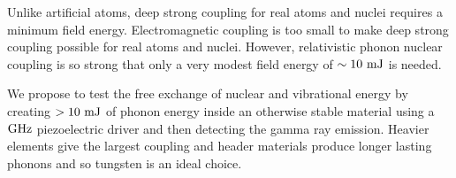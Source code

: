 \documentclass[
]{article}
\renewcommand{\[}{\begin{equation}}
\renewcommand{\]}{\end{equation}}
\begin{document}
Unlike artificial atoms, deep strong coupling for real atoms and nuclei
requires a minimum field energy. Electromagnetic coupling is too small
to make deep strong coupling possible for real atoms and nuclei.
However, relativistic phonon nuclear coupling is so strong that only a
very modest field energy of \(\sim \rm 10 \ mJ\) is needed.

We propose to test the free exchange of nuclear and vibrational energy
by creating \(>10 \ \rm mJ\) of phonon energy inside an otherwise stable
material using a \(\rm GHz\) piezoelectric driver and then detecting the
gamma ray emission. Heavier elements give the largest coupling and
header materials produce longer lasting phonons and so tungsten is an
ideal choice.

\printbibliography
\end{document}
